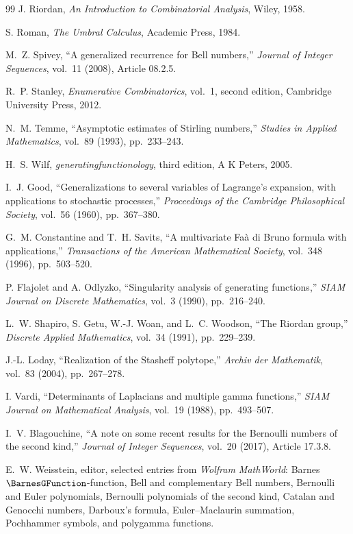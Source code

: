 \documentclass[11pt,a4paper,oneside,openany]{book}
\theoremstyle{definition}
\theoremstyle{remark}
\begin{document}
\begin{thebibliography}{99}
J. Riordan,
\emph{An Introduction to Combinatorial Analysis},
Wiley, 1958.

S. Roman,
\emph{The Umbral Calculus},
Academic Press, 1984.

M.~Z. Spivey,
``A generalized recurrence for Bell numbers,''
\emph{Journal of Integer Sequences}, vol.~11 (2008), Article 08.2.5.

R.~P. Stanley,
\emph{Enumerative Combinatorics}, vol.~1, second edition,
Cambridge University Press, 2012.

N.~M. Temme,
``Asymptotic estimates of Stirling numbers,''
\emph{Studies in Applied Mathematics}, vol.~89 (1993), pp.~233--243.

H.~S. Wilf,
\emph{generatingfunctionology}, third edition,
A K Peters, 2005.

I.~J. Good,
``Generalizations to several variables of Lagrange's expansion, with
applications to stochastic processes,''
\emph{Proceedings of the Cambridge Philosophical Society}, vol.~56 (1960),
pp.~367--380.

G.~M. Constantine and T.~H. Savits,
``A multivariate Fa\`a di Bruno formula with applications,''
\emph{Transactions of the American Mathematical Society}, vol.~348 (1996),
pp.~503--520.

P. Flajolet and A. Odlyzko,
``Singularity analysis of generating functions,''
\emph{SIAM Journal on Discrete Mathematics}, vol.~3 (1990), pp.~216--240.

L.~W. Shapiro, S. Getu, W.-J. Woan, and L.~C. Woodson,
``The Riordan group,''
\emph{Discrete Applied Mathematics}, vol.~34 (1991), pp.~229--239.

J.-L. Loday,
``Realization of the Stasheff polytope,''
\emph{Archiv der Mathematik}, vol.~83 (2004), pp.~267--278.

I. Vardi,
``Determinants of Laplacians and multiple gamma functions,''
\emph{SIAM Journal on Mathematical Analysis}, vol.~19 (1988), pp.~493--507.

I.~V. Blagouchine,
``A note on some recent results for the Bernoulli numbers of the second kind,''
\emph{Journal of Integer Sequences}, vol.~20 (2017), Article 17.3.8.

E.~W. Weisstein, editor,
selected entries from \emph{Wolfram MathWorld}: Barnes $\BarnesGFunction$-function, Bell and
complementary Bell numbers, Bernoulli and Euler polynomials, Bernoulli
polynomials of the second kind, Catalan and Genocchi numbers, Darboux's formula,
Euler--Maclaurin summation, Pochhammer symbols, and polygamma functions.


\end{thebibliography}
\end{document}
